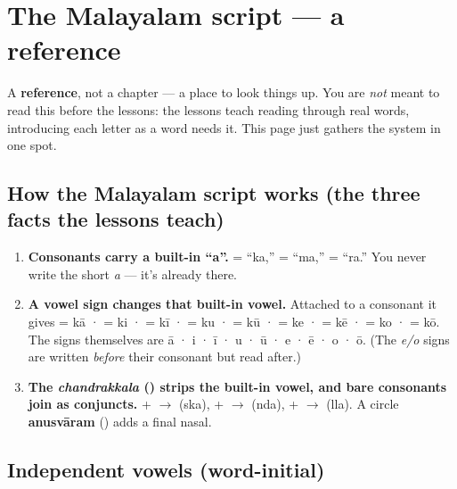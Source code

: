 
\chapter*{The Malayalam script --- a reference}

A \textbf{reference}, not a chapter — a place to look things up. You are \emph{not} meant to read this before the lessons: the lessons teach reading through real words, introducing each letter as a word needs it. This page just gathers the system in one spot.

\section*{How the Malayalam script works (the three facts the lessons teach)}

\begin{enumerate}
\raggedright
\setlength{\itemsep}{0.35em}
  \item \textbf{Consonants carry a built-in \textquotedblleft{}a\textquotedblright{}.}  = \textquotedblleft{}ka,\textquotedblright{}  = \textquotedblleft{}ma,\textquotedblright{}  = \textquotedblleft{}ra.\textquotedblright{} You never write the short \emph{a} — it's already there.
  \item \textbf{A vowel sign changes that built-in vowel.} Attached to a consonant it gives  = kā ·  = ki ·  = kī ·  = ku ·  = kū ·  = ke ·  = kē ·  = ko ·  = kō. The signs themselves are \textbf{} ā · \textbf{} i · \textbf{} ī · \textbf{} u · \textbf{} ū · \textbf{} e · \textbf{} ē · \textbf{} o · \textbf{} ō. (The \emph{e/o} signs are written \emph{before} their consonant but read after.)
  \item \textbf{The \emph{chandrakkala} () strips the built-in vowel, and bare consonants join as conjuncts.}  +  $\to$  (ska),  +  $\to$  (nda),  +  $\to$  (lla). A circle \textbf{anusvāram} () adds a final nasal.
\end{enumerate}

\section*{Independent vowels (word-initial)}

